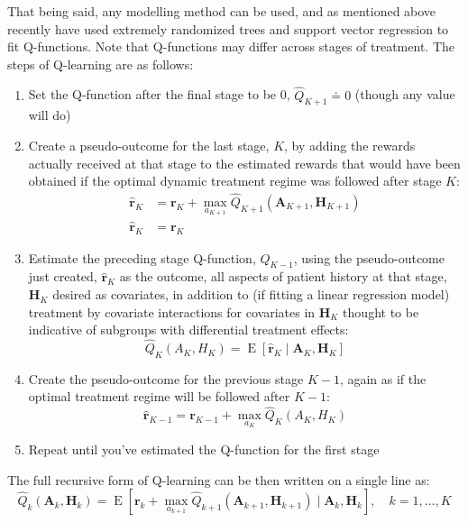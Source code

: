 \documentclass[12pt]{article}
\begin{document}
That being said, any modelling method can be used, and as mentioned above recently \textcite{crt} have used extremely randomized trees and support vector regression to fit Q-functions. Note that Q-functions may differ across stages of treatment. The steps of Q-learning are as follows:

\begin{enumerate}
  \item Set the Q-function after the final stage to be 0, $\hat{Q}_{K+1} \doteq 0$ (though any value will do)
  \item Create a pseudo-outcome for the last stage, $K$, by adding the rewards actually received at that stage to the estimated rewards that would have been obtained if the optimal dynamic treatment regime was followed after stage $K$:
  \begin{align}
    \hat{\bm{r}}_{K} &= \bm{r}_{K} + \max_{a_{K+1}} \hat{Q}_{K+1}(\bm{A}_{K+1}, \bm{H}_{K+1}) \\
    \hat{\bm{r}}_{K} &= \bm{r}_{K}
  \end{align}
  \item Estimate the preceding stage Q-function, $Q_{K - 1}$, using the pseudo-outcome just created, $\hat{\bm{r}}_{K}$ as the outcome, all aspects of patient history at that stage, $\bm{H}_{K}$ desired as covariates, in addition to (if fitting a linear regression model) treatment by covariate interactions for covariates in $\bm{H}_{K}$ thought to be indicative of subgroups with differential treatment effects:
  \begin{equation}
      \hat{Q}_{K}(A_{K}, H_{K}) = \operatorname{E}[\hat{\bm{r}}_{K} \mid \bm{A}_{K}, \bm{H}_{K}]
  \end{equation}
  \item Create the pseudo-outcome for the previous stage $K - 1$, again as if the optimal treatment regime will be followed after $K - 1$:
  \begin{equation}
    \hat{\bm{r}}_{K-1} = \bm{r}_{K-1} + \max_{a_K} \hat{Q}_{K}(A_{K}, H_{K})
  \end{equation}
  \item Repeat until you've estimated the Q-function for the first stage
\end{enumerate}

The full recursive form of Q-learning can be then written on a single line as:
  \begin{equation}
     \hat{Q}_{k}(\bm{A}_{k}, \bm{H}_{k})  = \operatorname{E}[\bm{r}_{k} + \max_{a_{k+1}} \hat{Q}_{k+1}(\bm{A}_{k+1}, \bm{H}_{k+1}) \mid \bm{A}_{k}, \bm{H}_{k}], \quad k = 1, \ldots, K
  \end{equation}
\end{document}
